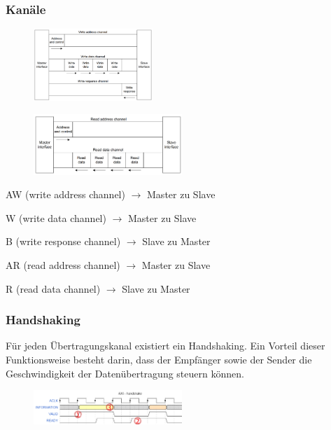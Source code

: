 \subsubsection{Kanäle}
\begin{multicols}{2}
    \begin{figure}[H]
     	\includegraphics[width=0.4\textwidth]{images/AXI_Write_Data_Channels.png}
     \end{figure}
     \begin{figure}[H]
     	\includegraphics[width=0.5\textwidth]{images/AXI_Read_Data_Channels.png}
     \end{figure}
\end{multicols}

\begin{multicols}{2}
    \begin{compactitem}
        \item AW (write address channel) $\rightarrow$ Master zu Slave
        \item W (write data channel) $\rightarrow$ Master zu Slave
        \item B (write response channel) $\rightarrow$ Slave zu Master
        \item AR (read address channel) $\rightarrow$ Master zu Slave
        \item R (read data channel) $\rightarrow$ Slave zu Master
    \end{compactitem}
\end{multicols}

\begin{multicols}{2}
    \subsubsection{Handshaking}
    Für jeden Übertragungskanal existiert ein Handshaking. Ein Vorteil dieser Funktionsweise besteht darin, dass der Empfänger sowie der Sender die Geschwindigkeit der Datenübertragung steuern können.
     \begin{figure}[H]
     	\includegraphics[width=0.5\textwidth]{images/AXI_Handshaking.png}
     \end{figure}
\end{multicols}

